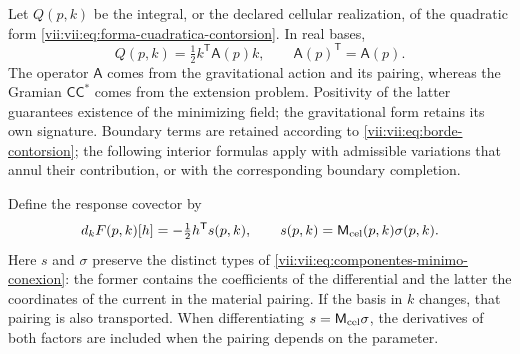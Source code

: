 Let \(Q(p,k)\) be the integral, or the declared cellular
realization, of the quadratic form
\eqref{vii:vii:eq:forma-cuadratica-contorsion}. In real bases,
\begin{equation}
 Q(p,k)=\tfrac12 k^{\mathsf T}\mathsf A(p)k,
 \qquad \mathsf A(p)^{\mathsf T}=\mathsf A(p).
 \label{vii:vii:eq:cuadratica-celular-contorsion}
\end{equation}
The operator \(\mathsf A\) comes from the gravitational action and
its pairing, whereas the Gramian
\(\mathsf C\mathsf C^*\) comes from the extension problem.
Positivity of the latter guarantees existence of the minimizing
field; the gravitational form retains its own signature.
Boundary terms are retained according to
\eqref{vii:vii:eq:borde-contorsion}; the following interior formulas
apply with admissible variations that annul their contribution, or
with the corresponding boundary completion.

Define the response covector by
\begin{equation}
 d_kF(p,k)[h]= -\tfrac12 h^{\mathsf T}s(p,k),
 \qquad s(p,k)=\mathsf M_{\rm cel}(p,k)\sigma(p,k).
 \label{vii:vii:eq:covector-torsional-minimo}
\end{equation}
Here \(s\) and \(\sigma\) preserve the distinct types of
\eqref{vii:vii:eq:componentes-minimo-conexion}: the former contains the
coefficients of the differential and the latter the coordinates of the
current in the material pairing. If the basis in
\(k\) changes, that pairing is also transported. When differentiating
\(s=\mathsf M_{\rm cel}\sigma\), the derivatives of
both factors are included when the pairing depends on the parameter.

